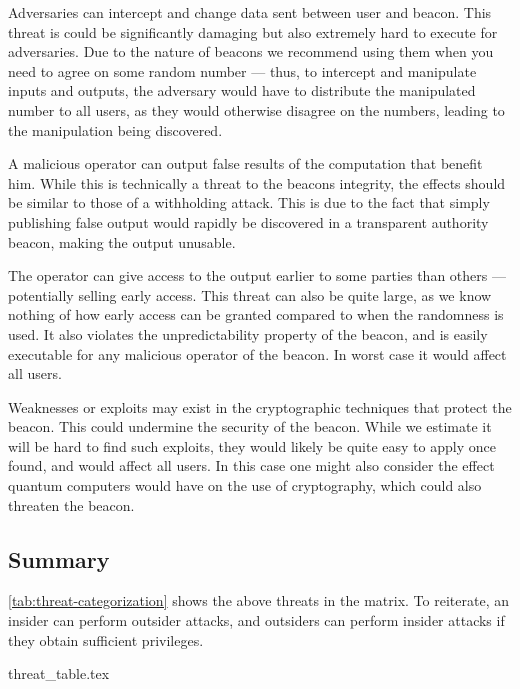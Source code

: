 Adversaries can intercept and change data sent between user and beacon.
This threat is could be significantly damaging but also extremely hard to execute for adversaries.
Due to the nature of beacons we recommend using them when you need to agree on some random number --- thus, to intercept and manipulate inputs and outputs, the adversary would have to distribute the manipulated number to all users, as they would otherwise disagree on the numbers, leading to the manipulation being discovered.

A malicious operator can output false results of the computation that benefit him.
While this is technically a threat to the beacons integrity, the effects should be similar to those of a withholding attack.
This is due to the fact that simply publishing false output would rapidly be discovered in a transparent authority beacon, making the output unusable.

The operator can give access to the output earlier to some parties than others --- potentially selling early access.
This threat can also be quite large, as we know nothing of how early access can be granted compared to when the randomness is used.
It also violates the unpredictability property of the beacon, and is easily executable for any malicious operator of the beacon.
In worst case it would affect all users.

Weaknesses or exploits may exist in the cryptographic techniques that protect the beacon.
This could undermine the security of the beacon.
While we estimate it will be hard to find such exploits, they would likely be quite easy to apply once found, and would affect all users.
In this case one might also consider the effect quantum computers would have on the use of cryptography, which could also threaten the beacon.


\subsection{Summary}

\cref{tab:threat-categorization} shows the above threats in the matrix.
To reiterate, an insider can perform outsider attacks, and outsiders can perform insider attacks if they obtain sufficient privileges.

{threat_table.tex}
